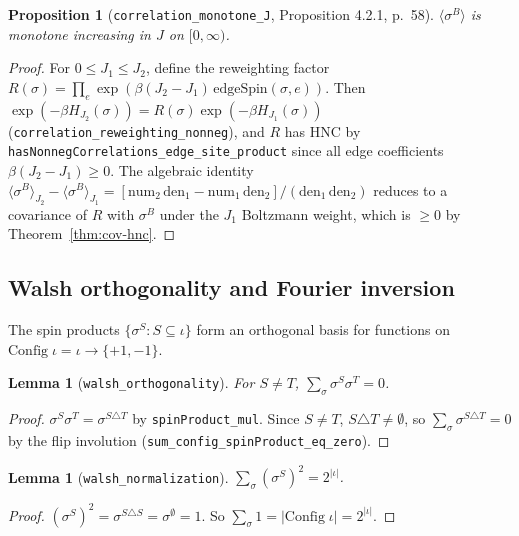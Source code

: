 \documentclass[a4paper,11pt]{article}
\newtheorem{lemma}[theorem]{Lemma}
\newtheorem{proposition}[theorem]{Proposition}
\begin{document}
\begin{proposition}[\texttt{correlation\_monotone\_J}, Proposition 4.2.1, p.~58]
$\langle\sigma^B\rangle$ is monotone increasing in $J$ on $[0,\infty)$.
\end{proposition}

\begin{proof}
For $0 \le J_1 \le J_2$, define the reweighting factor
$R(\sigma) = \prod_e \exp(\beta(J_2 - J_1)\,\text{edgeSpin}(\sigma,e))$.
Then $\exp(-\beta H_{J_2}(\sigma)) = R(\sigma)\exp(-\beta H_{J_1}(\sigma))$
(\texttt{correlation\_reweighting\_nonneg}), and $R$ has HNC by
\texttt{hasNonnegCorrelations\_edge\_site\_product} since all edge
coefficients $\beta(J_2 - J_1) \ge 0$.
The algebraic identity
$\langle\sigma^B\rangle_{J_2} - \langle\sigma^B\rangle_{J_1}
= [\text{num}_2\,\text{den}_1 - \text{num}_1\,\text{den}_2]
  / (\text{den}_1\,\text{den}_2)$
reduces to a covariance of $R$ with $\sigma^B$ under the $J_1$ Boltzmann
weight, which is $\ge 0$ by Theorem~\ref{thm:cov-hnc}.
\end{proof}

\subsection{Walsh orthogonality and Fourier inversion}

The spin products $\{\sigma^S : S \subseteq \iota\}$ form an orthogonal
basis for functions on $\mathrm{Config}\;\iota = \iota \to \{+1,-1\}$.

\begin{lemma}[\texttt{walsh\_orthogonality}]
For $S \ne T$, $\sum_\sigma \sigma^S \sigma^T = 0$.
\end{lemma}

\begin{proof}
$\sigma^S \sigma^T = \sigma^{S \triangle T}$ by \texttt{spinProduct\_mul}.
Since $S \ne T$, $S \triangle T \ne \emptyset$, so
$\sum_\sigma \sigma^{S \triangle T} = 0$ by the flip involution
(\texttt{sum\_config\_spinProduct\_eq\_zero}).
\end{proof}

\begin{lemma}[\texttt{walsh\_normalization}]
$\sum_\sigma (\sigma^S)^2 = 2^{|\iota|}$.
\end{lemma}

\begin{proof}
$(\sigma^S)^2 = \sigma^{S \triangle S} = \sigma^\emptyset = 1$.
So $\sum_\sigma 1 = |\mathrm{Config}\;\iota| = 2^{|\iota|}$.
\end{proof}
\end{document}
